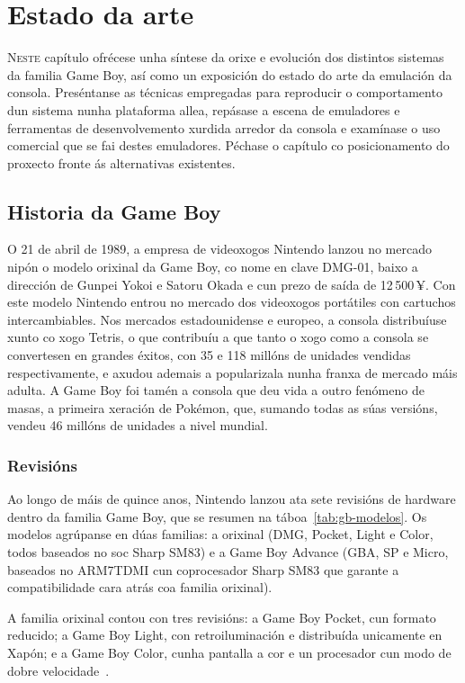 \chapter{Estado da arte}
\label{chap:arte}

\lettrine{N}{este} capítulo ofrécese unha síntese da orixe e evolución dos distintos sistemas da familia Game Boy,
así como un exposición do estado do arte da emulación da consola.
Preséntanse as técnicas empregadas para reproducir o comportamento dun sistema nunha plataforma allea,
repásase a escena de emuladores e ferramentas de desenvolvemento xurdida arredor da consola
e examínase o uso comercial que se fai destes emuladores.
Péchase o capítulo co posicionamento do proxecto fronte ás alternativas existentes.

\section{Historia da Game Boy}
O 21 de abril de 1989, a empresa de videoxogos Nintendo lanzou no mercado nipón o modelo orixinal da Game Boy,
co nome en clave DMG-01, baixo a dirección de Gunpei Yokoi e Satoru Okada e cun prezo de saída de 12\,500\,¥.
Con este modelo Nintendo entrou no mercado dos videoxogos portátiles con cartuchos intercambiables.
Nos mercados estadounidense e europeo, a consola distribuíuse xunto co xogo Tetris,
o que contribuíu a que tanto o xogo como a consola se convertesen en grandes éxitos,
con 35 e 118 millóns de unidades vendidas respectivamente, e axudou ademais a popularizala nunha franxa de mercado máis adulta.
A Game Boy foi tamén a consola que deu vida a outro fenómeno de masas,
a primeira xeración de Pokémon, que, sumando todas as súas versións, vendeu 46 millóns de unidades a nivel mundial.

\subsection{Revisións}

Ao longo de máis de quince anos, Nintendo lanzou ata sete revisións de hardware
dentro da familia Game Boy, que se resumen na táboa~\ref{tab:gb-modelos}.
Os modelos agrúpanse en dúas familias: a orixinal (DMG, Pocket, Light e
Color, todos baseados no \acrfull{soc} Sharp SM83) e a
Game Boy Advance (GBA, SP e Micro, baseados no ARM7TDMI cun coprocesador Sharp
SM83 que garante a compatibilidade cara atrás coa familia orixinal).

A familia orixinal contou con tres revisións: a Game Boy Pocket, cun formato reducido;
a Game Boy Light, con retroiluminación e distribuída unicamente en Xapón;
e a Game Boy Color, cunha pantalla a cor e un procesador cun modo de dobre velocidade~\cite{gameboycolor}.

